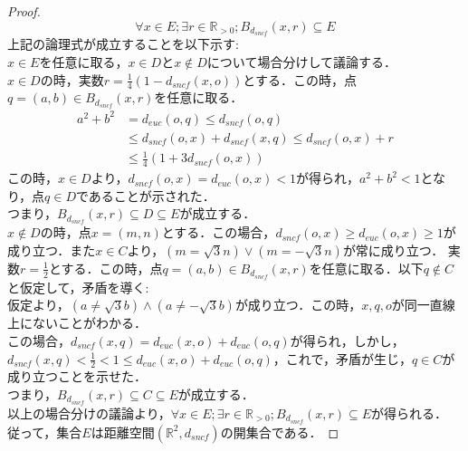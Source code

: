 \documentclass{jreport}
\newcommand{\de}{d_{euc}}
\newcommand{\ds}{d_{sncf}}
\newcommand{\bs}{B_{\ds}}
\newcommand{\R}{\mathbb{R}}
\newcommand{\Rp}{\mathbb{R}_{>0}}
\begin{document}
\begin{proof}
$$
\forall x \in E; \exists r \in \Rp ; \bs(x,r) \subseteq E
$$
上記の論理式が成立することを以下示す:\\
$x \in E$を任意に取る，$x \in D$と$x \notin D$について場合分けして議論する．\\
$x \in D$の時，実数$r = \frac{1}{4}(1-\ds(x,o))$とする．この時，点$q=(a,b) \in \bs(x,r)$を任意に取る．\\
$$
\begin{aligned}
a^2+b^2 &= \de(o,q) \le \ds(o,q)  \\
        &\le  \ds(o,x) +\ds(x,q) \le \ds(o,x) +r \\
	&\le \frac{1}{4}(1+3\ds(o,x))
\end{aligned}
$$
この時，$x \in D $より，$\ds(o,x)=\de(o,x)<1$が得られ，$a^2 +b^2<1$となり，点$q \in D$であることが示された．\\
つまり，$\bs(x,r) \subseteq D \subseteq E$が成立する．\\
$x \notin D$の時，点$x=(m,n)$とする．この場合，$\ds(o,x) \ge \de(o,x) \ge 1$が成り立つ．また$x \in C$より，$(m=\sqrt{3}n) \lor (m=-\sqrt{3}n)$が常に成り立つ．
実数$r = \frac{1}{2}$とする．この時，点$q=(a,b) \in \bs(x,r)$を任意に取る．以下$q \notin C$と仮定して，矛盾を導く:\\
仮定より，$(a \neq \sqrt{3}b ) \land (a \neq - \sqrt{3}b)$が成り立つ．この時，$x,q,o$が同一直線上にないことがわかる．\\
この場合，$\ds(x,q)=\de(x,o)+ \de(o,q)$が得られ，しかし，$\ds(x,q)<\frac{1}{2}<1\le \de(x,o)+\de(o,q)$，これで，矛盾が生じ，$q \in C$が成り立つことを示せた．\\
つまり，$\bs(x,r) \subseteq C \subseteq E$が成立する．\\
以上の場合分けの議論より，$\forall x \in E; \exists r \in \Rp ; \bs(x,r) \subseteq E$が得られる．\\
従って，集合$E$は距離空間$(\R^2, \ds)$の開集合である．
\end{proof}
\newpage
\end{document}
